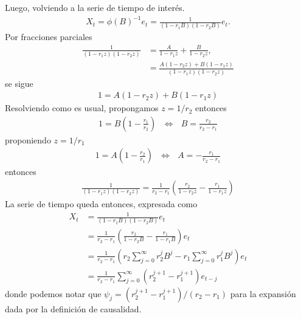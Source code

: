 \documentclass[a4paper, 11pt]{article}
\begin{document}
Luego, volviendo a la serie de tiempo de interés. 
\begin{align*}
    X_t = \phi(B)^{-1}e_t = \frac{1}{(1-r_1 B)(1-r_2 B )}e_t .
\end{align*}
Por fracciones parciales 
\begin{align*}
    \frac{1}{(1-r_1z )(1-r_2 z )} &= \frac{A}{1-r_1z} + \frac{B}{1-r_2 z },\\
    &= \frac{A(1-r_2 z )+ B(1-r_1 z)}{(1-r_1 z)(1-r_2 z )}
\end{align*}
se sigue 
\begin{align*}
    1 = A(1-r_2 z )+ B(1-r_1 z)
\end{align*}
Resolviendo como es usual, propongamos $z = 1/r_2$ entonces
\begin{align*}
    1 = B \left(1- \frac{r_1}{r_2}\right)  \:\:\: \Leftrightarrow \:\:\: B = \frac{r_2}{r_2- r_1}
\end{align*}
proponiendo $z = 1/r_1$
\begin{align*}
    1 = A \left(1-\frac{r_2}{r_1}\right) \:\:\: \Leftrightarrow \:\:\: A = -\frac{r_1}{r_2-r_1}
\end{align*}
entonces
\begin{align*}
    \frac{1}{(1-r_1z )(1-r_2 z )} = \frac{1}{r_2-r_1}\left(\frac{r_2}{1-r_2 z } - \frac{r_1}{1- r_1 z}\right)
\end{align*}
La serie de tiempo queda entonces, expresada como
\begin{align}
    X_t &= \frac{1}{(1-r_1B )(1-r_2 B )} e_t \nonumber\\
    &= \frac{1}{r_2-r_1}\left(\frac{r_2}{1-r_2 B } - \frac{r_1}{1- r_1 B}\right) e_t\nonumber\\
    &= \frac{1}{r_2-r_1} \left( r_2 \sum_{j=0}^{\infty} r_2^j B^j- r_1\sum_{j=0}^{\infty}r_1^jB^j \right) e_t\nonumber\\
    &= \frac{1}{r_2-r_1} \sum_{j = 0}^{\infty} (r_2^{j+1}-r_1^{j+1}) e_{t-j }
    \label{6.02}
\end{align}
donde podemos notar que $\psi_j = (r_2^{j+1}-r_1^{j+1})/(r_2-r_1)$ para la expansión dada por la definición de causalidad.
\end{document}
